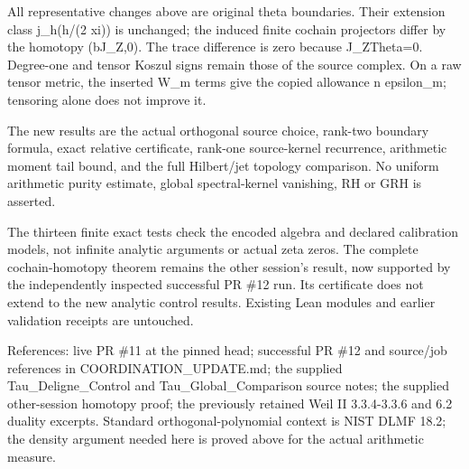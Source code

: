 All representative changes above are original theta boundaries. Their extension class j\_h(h/(2 xi))
is unchanged; the induced finite cochain projectors differ by the homotopy (bJ\_Z,0). The trace
difference is zero because J\_ZTheta=0. Degree-one and tensor Koszul signs remain those of the
source complex. On a raw tensor metric, the inserted W\_m terms give the copied allowance n
epsilon\_m; tensoring alone does not improve it.

The new results are the actual orthogonal source choice, rank-two boundary formula, exact relative
certificate, rank-one source-kernel recurrence, arithmetic moment tail bound, and the full
Hilbert/jet topology comparison. No uniform arithmetic purity estimate, global spectral-kernel
vanishing, RH or GRH is asserted.

The thirteen finite exact tests check the encoded algebra and declared calibration models, not
infinite analytic arguments or actual zeta zeros. The complete cochain-homotopy theorem remains the
other session's result, now supported by the independently inspected successful PR \#12 run. Its
certificate does not extend to the new analytic control results. Existing Lean modules and earlier
validation receipts are untouched.

References: live PR \#11 at the pinned head; successful PR \#12 and source/job references in
COORDINATION\_UPDATE.md; the supplied Tau\_Deligne\_Control and Tau\_Global\_Comparison source
notes; the supplied other-session homotopy proof; the previously retained Weil II 3.3.4-3.3.6 and
6.2 duality excerpts. Standard orthogonal-polynomial context is NIST DLMF 18.2; the density argument
needed here is proved above for the actual arithmetic measure.
